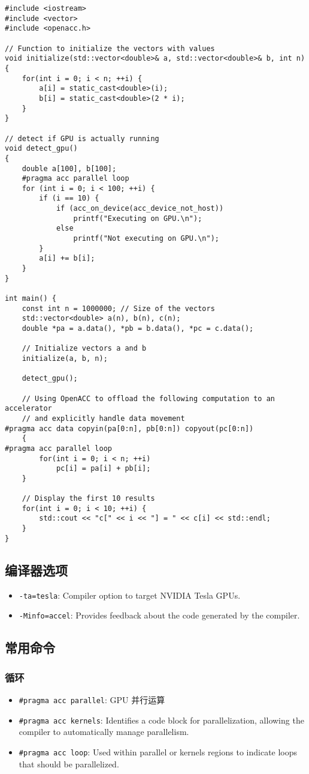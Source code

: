 \begin{lstlisting}[language=none,caption=test1.cpp]
#include <iostream>
#include <vector>
#include <openacc.h>

// Function to initialize the vectors with values
void initialize(std::vector<double>& a, std::vector<double>& b, int n) {
	for(int i = 0; i < n; ++i) {
		a[i] = static_cast<double>(i);
		b[i] = static_cast<double>(2 * i);
	}
}

// detect if GPU is actually running
void detect_gpu()
{
	double a[100], b[100];
	#pragma acc parallel loop
	for (int i = 0; i < 100; ++i) {
		if (i == 10) {
			if (acc_on_device(acc_device_not_host))
				printf("Executing on GPU.\n");
			else
				printf("Not executing on GPU.\n");
		}
		a[i] += b[i];
	}
}

int main() {
	const int n = 1000000; // Size of the vectors
	std::vector<double> a(n), b(n), c(n);
	double *pa = a.data(), *pb = b.data(), *pc = c.data();

	// Initialize vectors a and b
	initialize(a, b, n);

	detect_gpu();

	// Using OpenACC to offload the following computation to an accelerator
	// and explicitly handle data movement
#pragma acc data copyin(pa[0:n], pb[0:n]) copyout(pc[0:n])
	{
#pragma acc parallel loop
		for(int i = 0; i < n; ++i)
			pc[i] = pa[i] + pb[i];
	}

	// Display the first 10 results
	for(int i = 0; i < 10; ++i) {
		std::cout << "c[" << i << "] = " << c[i] << std::endl;
	}
}
\end{lstlisting}

\subsection{编译器选项}
\begin{itemize}
\item \verb`-ta=tesla`: Compiler option to target NVIDIA Tesla GPUs.
\item \verb`-Minfo=accel`: Provides feedback about the code generated by the compiler.
\end{itemize}

\subsection{常用命令}
\subsubsection{循环}
\begin{itemize}
\item \verb`#pragma acc parallel`: GPU 并行运算
\item \verb`#pragma acc kernels`: Identifies a code block for parallelization, allowing the compiler to automatically manage parallelism.
\item \verb`#pragma acc loop`: Used within parallel or kernels regions to indicate loops that should be parallelized.
\end{itemize}

